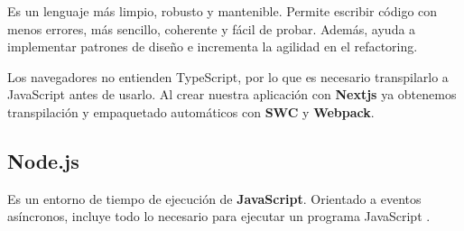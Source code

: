 \documentclass[12pt,twoside,titlepage]{report}
\begin{document}

Es un lenguaje más limpio, robusto y mantenible. Permite escribir código con menos errores, más sencillo, coherente y fácil de probar. Además, ayuda a implementar patrones de diseño e incrementa la agilidad en el refactoring.

Los navegadores no entienden TypeScript, por lo que es necesario transpilarlo a JavaScript antes de usarlo. Al crear nuestra aplicación con \textbf{Nextjs} ya obtenemos transpilación y empaquetado automáticos con \textbf{SWC} y \textbf{Webpack}.
\cite{typescript2}

\subsection{Node.js}
\label{sec:Node}

Es un entorno de tiempo de ejecución de \textbf{JavaScript}. Orientado a eventos asíncronos, incluye todo lo necesario para ejecutar un programa JavaScript \cite{node}.

\end{document}
